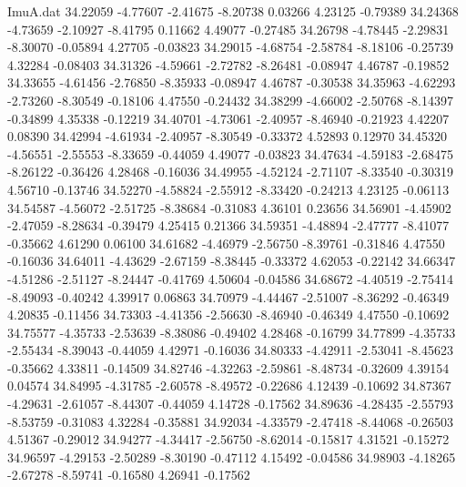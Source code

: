 \begin{filecontents}{ImuA.dat}
  34.22059   -4.77607   -2.41675   -8.20738    0.03266    4.23125   -0.79389
  34.24368   -4.73659   -2.10927   -8.41795    0.11662    4.49077   -0.27485
  34.26798   -4.78445   -2.29831   -8.30070   -0.05894    4.27705   -0.03823
  34.29015   -4.68754   -2.58784   -8.18106   -0.25739    4.32284   -0.08403
  34.31326   -4.59661   -2.72782   -8.26481   -0.08947    4.46787   -0.19852
  34.33655   -4.61456   -2.76850   -8.35933   -0.08947    4.46787   -0.30538
  34.35963   -4.62293   -2.73260   -8.30549   -0.18106    4.47550   -0.24432
  34.38299   -4.66002   -2.50768   -8.14397   -0.34899    4.35338   -0.12219
  34.40701   -4.73061   -2.40957   -8.46940   -0.21923    4.42207    0.08390
  34.42994   -4.61934   -2.40957   -8.30549   -0.33372    4.52893    0.12970
  34.45320   -4.56551   -2.55553   -8.33659   -0.44059    4.49077   -0.03823
  34.47634   -4.59183   -2.68475   -8.26122   -0.36426    4.28468   -0.16036
  34.49955   -4.52124   -2.71107   -8.33540   -0.30319    4.56710   -0.13746
  34.52270   -4.58824   -2.55912   -8.33420   -0.24213    4.23125   -0.06113
  34.54587   -4.56072   -2.51725   -8.38684   -0.31083    4.36101    0.23656
  34.56901   -4.45902   -2.47059   -8.28634   -0.39479    4.25415    0.21366
  34.59351   -4.48894   -2.47777   -8.41077   -0.35662    4.61290    0.06100
  34.61682   -4.46979   -2.56750   -8.39761   -0.31846    4.47550   -0.16036
  34.64011   -4.43629   -2.67159   -8.38445   -0.33372    4.62053   -0.22142
  34.66347   -4.51286   -2.51127   -8.24447   -0.41769    4.50604   -0.04586
  34.68672   -4.40519   -2.75414   -8.49093   -0.40242    4.39917    0.06863
  34.70979   -4.44467   -2.51007   -8.36292   -0.46349    4.20835   -0.11456
  34.73303   -4.41356   -2.56630   -8.46940   -0.46349    4.47550   -0.10692
  34.75577   -4.35733   -2.53639   -8.38086   -0.49402    4.28468   -0.16799
  34.77899   -4.35733   -2.55434   -8.39043   -0.44059    4.42971   -0.16036
  34.80333   -4.42911   -2.53041   -8.45623   -0.35662    4.33811   -0.14509
  34.82746   -4.32263   -2.59861   -8.48734   -0.32609    4.39154    0.04574
  34.84995   -4.31785   -2.60578   -8.49572   -0.22686    4.12439   -0.10692
  34.87367   -4.29631   -2.61057   -8.44307   -0.44059    4.14728   -0.17562
  34.89636   -4.28435   -2.55793   -8.53759   -0.31083    4.32284   -0.35881
  34.92034   -4.33579   -2.47418   -8.44068   -0.26503    4.51367   -0.29012
  34.94277   -4.34417   -2.56750   -8.62014   -0.15817    4.31521   -0.15272
  34.96597   -4.29153   -2.50289   -8.30190   -0.47112    4.15492   -0.04586
  34.98903   -4.18265   -2.67278   -8.59741   -0.16580    4.26941   -0.17562

\end{filecontents}
